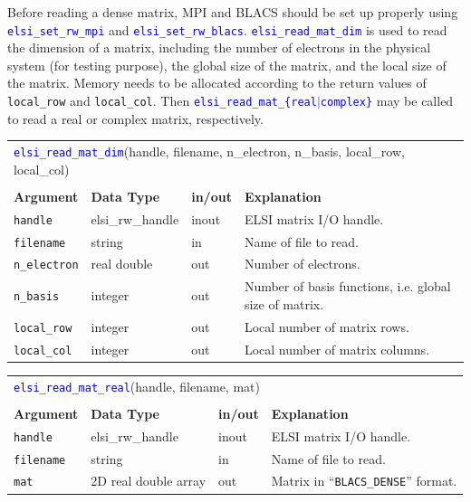 \documentclass{report}
\newcommand{\api}[1]{\textcolor{blue}{\texttt{#1}}}
\begin{document}
Before reading a dense matrix, MPI and BLACS should be set up properly using \api{elsi\_set\_rw\_mpi} and \api{elsi\_set\_rw\_blacs}. \api{elsi\_read\_mat\_dim} is used to read the dimension of a matrix, including the number of electrons in the physical system (for testing purpose), the global size of the matrix, and the local size of the matrix. Memory needs to be allocated according to the return values of \texttt{local\_row} and \texttt{local\_col}. Then \api{elsi\_read\_mat\_\{real$\vert$complex\}} may be called to read a real or complex matrix, respectively.

\begin{tabular}[]{|p{20mm}|p{40mm}|p{10mm}|p{92mm}|}
\multicolumn{4}{l}{\api{elsi\_read\_mat\_dim}(handle, filename, n\_electron, n\_basis, local\_row, local\_col)}\\
\multicolumn{4}{l}{}\\
\hline
\multicolumn{1}{|l|}{\textbf{Argument}} & \multicolumn{1}{l|}{\textbf{Data Type}} & \multicolumn{1}{l|}{\textbf{in/out}} & \multicolumn{1}{l|}{\textbf{Explanation}}\\
\hline
\texttt{handle}      & elsi\_rw\_handle & inout & ELSI matrix I/O handle.\\
\hline
\texttt{filename}    & string           & in    & Name of file to read.\\
\hline
\texttt{n\_electron} & real double      & out   & Number of electrons.\\
\hline
\texttt{n\_basis}    & integer          & out   & Number of basis functions, i.e. global size of matrix.\\
\hline
\texttt{local\_row}  & integer          & out   & Local number of matrix rows.\\
\hline
\texttt{local\_col}  & integer          & out   & Local number of matrix columns.\\
\hline
\end{tabular}

\begin{tabular}[]{|p{20mm}|p{40mm}|p{10mm}|p{92mm}|}
\multicolumn{4}{l}{\api{elsi\_read\_mat\_real}(handle, filename, mat)}\\
\multicolumn{4}{l}{}\\
\hline
\multicolumn{1}{|l|}{\textbf{Argument}} & \multicolumn{1}{l|}{\textbf{Data Type}} & \multicolumn{1}{l|}{\textbf{in/out}} & \multicolumn{1}{l|}{\textbf{Explanation}}\\
\hline
\texttt{handle}   & elsi\_rw\_handle     & inout & ELSI matrix I/O handle.\\
\hline
\texttt{filename} & string               & in    & Name of file to read.\\
\hline
\texttt{mat}      & 2D real double array & out   & Matrix in ``\texttt{BLACS\_DENSE}'' format.\\
\hline
\end{tabular}
\end{document}
